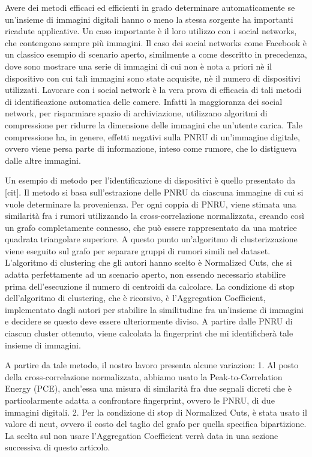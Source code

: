 Avere dei metodi efficaci ed efficienti in grado determinare automaticamente se un'insieme di immagini digitali hanno o meno la stessa sorgente ha importanti ricadute applicative. Un caso importante è il loro utilizzo con i social networks, che contengono sempre più immagini. Il caso dei social networks come Facebook è un classico esempio di scenario aperto, similmente a come descritto in precedenza, dove sono mostrare una serie di immagini di cui non è nota a priori nè il dispositivo con cui tali immagini sono state acquisite, nè il numero di dispositivi utilizzati. Lavorare con i social network è la vera prova di efficacia di tali metodi di identificazione automatica delle camere. Infatti la maggioranza dei social network, per risparmiare spazio di archiviazione, utilizzano algoritmi di compressione per ridurre la dimensione delle immagini che un'utente carica. Tale compressione ha, in genere, effetti negativi sulla PNRU di un'immagine digitale, ovvero viene persa parte di informazione, inteso come rumore, che lo distigueva dalle altre immagini.

Un esempio di metodo per l'identificazione di dispositivi è quello presentato da [cit]. Il metodo si basa sull'estrazione delle PNRU da ciascuna immagine di cui si vuole determinare la provenienza. Per ogni coppia di PNRU, viene stimata una similarità fra i rumori utilizzando la cross-correlazione normalizzata, creando così un grafo completamente connesso, che può essere rappresentato da una matrice quadrata triangolare superiore. A questo punto un'algoritmo di clusterizzazione viene eseguito sul grafo per separare gruppi di rumori simili nel dataset. L'algoritmo di clustering che gli autori hanno scelto è Normalized Cuts, che si adatta perfettamente ad un scenario aperto, non essendo necessario stabilire prima dell'esecuzione il numero di centroidi da calcolare. La condizione di stop dell'algoritmo di clustering, che è ricorsivo, è l'Aggregation Coefficient, implementato dagli autori per stabilire la similitudine fra un'insieme di immagini e decidere se questo deve essere ulteriormente diviso. A partire dalle PNRU di ciascun cluster ottenuto, viene calcolata la fingerprint che mi identificherà tale insieme di immagini.

A partire da tale metodo, il nostro lavoro presenta alcune variazion:
1. Al posto della cross-correlazione normalizzata, abbiamo usato la Peak-to-Correlation Energy (PCE), anch'essa una misura di similarità fra due segnali dicreti che è particolarmente adatta a confrontare fingerprint, ovvero le PNRU, di due immagini digitali.
2. Per la condizione di stop di Normalized Cuts, è stata usato il valore di ncut, ovvero il costo del taglio del grafo per quella specifica bipartizione. La scelta sul non usare l'Aggregation Coefficient verrà data in una sezione successiva di questo articolo.

